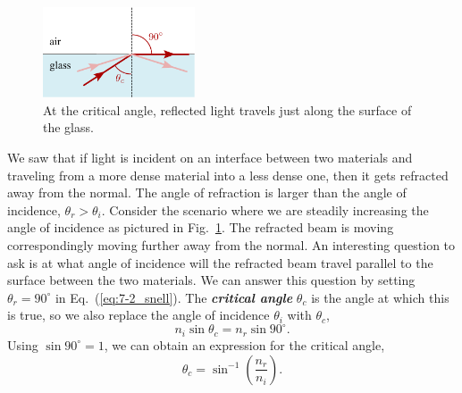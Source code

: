 \begin{figure}
    \centering
    \includegraphics[width=0.4\textwidth]{lesson7/7-3_total_internal_reflection.pdf}
    \caption[Total internal reflection]{At the critical angle, reflected light travels just along the surface of the glass.}
    \label{fig:7-3_total_internal_reflection}
\end{figure}
We saw that if light is incident on an interface between two materials and traveling from a more dense material into a less dense one, then it gets refracted away from the normal.
The angle of refraction is larger than the angle of incidence, $\theta_r > \theta_i$. Consider the scenario where we are steadily increasing the angle of incidence as pictured in Fig.~\ref{fig:7-3_total_internal_reflection}.
The refracted beam is moving correspondingly moving further away from the normal.
An interesting question to ask is at what angle of incidence will the refracted beam travel parallel to the surface between the two materials.
We can answer this question by setting $\theta_r=90^{\circ}$ in Eq.~(\ref{eq:7-2_snell}).
The \textit{\textbf{critical angle}} $\theta_c$ is the angle at which this is true, so we also replace the angle of incidence $\theta_i$ with $\theta_c$,
\begin{equation}
    n_i \sin \theta_c = n_r \sin 90^{\circ}.
    \label{eq:7-4_crit_angle}
\end{equation}
Using $\sin 90^{\circ} = 1$, we can obtain an expression for the critical angle,
\begin{equation}
    \theta_c=\sin ^{-1}\left(\frac{n_r}{n_i}\right).
    \label{eq:7-3_crit_angle}
\end{equation}



